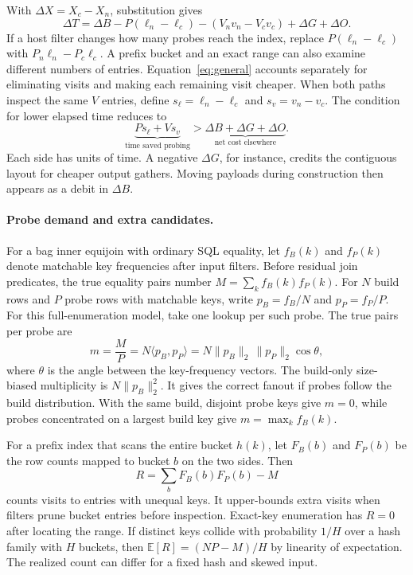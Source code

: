 \documentclass[11pt,a4paper]{article}
\begin{document}
With $\Delta X=X_c-X_n$, substitution gives
\begin{equation}
 \Delta T=\Delta B-P(\ell_n-\ell_c)
                -(V_n v_n-V_c v_c)+\Delta G+\Delta O .
 \label{eq:general}
\end{equation}
If a host filter changes how many probes reach the index, replace $P(\ell_n-\ell_c)$ with
$P_n\ell_n-P_c\ell_c$. A prefix bucket and an exact range can also examine different numbers of
entries. Equation~\eqref{eq:general} accounts separately for eliminating visits and making each
remaining visit cheaper. When both paths inspect the same $V$ entries, define
$s_\ell=\ell_n-\ell_c$ and $s_v=v_n-v_c$. The condition for lower elapsed time reduces to
\begin{equation}
 \underbrace{P s_\ell+V s_v}_{\text{time saved probing}}
       > \underbrace{\Delta B+\Delta G+\Delta O}_{\text{net cost elsewhere}} .
 \label{eq:break}
\end{equation}
Each side has units of time. A negative $\Delta G$, for instance, credits the contiguous layout
for cheaper output gathers. Moving payloads during construction then appears as a debit in $\Delta
B$.

\paragraph{Probe demand and extra candidates.}
For a bag inner equijoin with ordinary SQL equality, let $f_B(k)$ and $f_P(k)$ denote
matchable key frequencies after input filters. Before residual join predicates, the true
equality pairs number $M=\sum_k f_B(k)f_P(k)$. For $N$ build rows and $P$ probe rows with
matchable keys, write $p_B=f_B/N$ and $p_P=f_P/P$. For this full-enumeration model, take
one lookup per such probe. The true pairs per probe are
\begin{equation}
  m=\frac{M}{P}=N\langle p_B,p_P\rangle
    =N\|p_B\|_2\,\|p_P\|_2\cos\theta ,
  \label{eq:overlap}
\end{equation}
where $\theta$ is the angle between the key-frequency vectors. The build-only size-biased
multiplicity is $N\|p_B\|_2^2$. It gives the correct fanout if probes follow the build
distribution. With the same build, disjoint probe keys give $m=0$, while probes concentrated
on a largest build key give $m=\max_k f_B(k)$.

For a prefix index that scans the entire bucket $h(k)$, let $F_B(b)$ and $F_P(b)$ be the
row counts mapped to bucket $b$ on the two sides. Then
\begin{equation}
  R=\sum_b F_B(b) F_P(b)-M
  \label{eq:collision}
\end{equation}
counts visits to entries with unequal keys.
It upper-bounds extra visits when filters prune bucket entries before inspection. Exact-key
enumeration has $R=0$ after locating the range. If distinct keys collide with probability
$1/H$ over a hash family with $H$ buckets, then $\mathbb E[R]=(NP-M)/H$ by linearity of
expectation. The realized count can differ for a fixed hash and skewed input.
\end{document}
